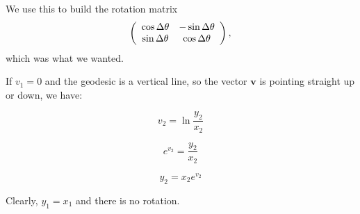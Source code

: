 We use this to build the rotation matrix $$\left(\begin{array}{ccc} \cos \Delta\theta & -\sin \Delta\theta \\\sin \Delta\theta & \cos \Delta\theta \end{array} \right),$$ which was what we wanted.

If $v_1 = 0$ and the geodesic is a vertical line, so the vector $\textbf{v}$ is pointing straight up or down, we have:

$$v_2 = \ln\frac{y_2}{x_2}$$

$$e^{v_2} = \frac{y_2}{x_2}$$

$$y_2 = x_2e^{v_2}$$

Clearly, $y_1 = x_1$ and there is no rotation.


